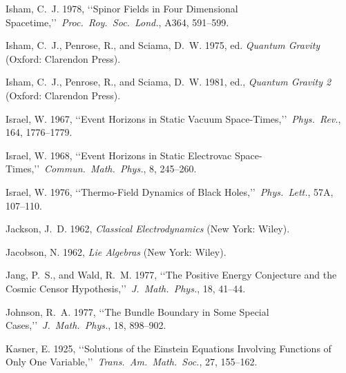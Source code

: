 
\item Isham, C.~J. 1978, \lq\lq Spinor Fields in Four Dimensional Spacetime,\rq\rq\ \emph{Proc.\ Roy.\ Soc.\ Lond.}, A364, 591--599.
\item Isham, C.~J., Penrose, R., and Sciama, D.~W. 1975, ed. \emph{Quantum Gravity} (Oxford: Clarendon Press).
\item Isham, C.~J., Penrose, R., and Sciama, D.~W. 1981, ed., \emph{Quantum Gravity 2} (Oxford: Clarendon Press).
\item Israel, W. 1967, \lq\lq Event Horizons in Static Vacuum Space-Times,\rq\rq\ \emph{Phys.\ Rev.}, 164, 1776--1779.
\item Israel, W. 1968, \lq\lq Event Horizons in Static Electrovac Space-Times,\rq\rq\ \emph{Commun.\ Math.\ Phys.}, 8, 245--260.
\item Israel, W. 1976, \lq\lq Thermo-Field Dynamics of Black Holes,\rq\rq\ \emph{Phys.\ Lett.}, 57A, 107--110.
\item Jackson, J.~D. 1962, \emph{Classical Electrodynamics} (New York: Wiley).
\item Jacobson, N. 1962, \emph{Lie Algebras} (New York: Wiley).
\item Jang, P.~S., and Wald, R.~M. 1977, \lq\lq The Positive Energy Conjecture and the Cosmic Censor Hypothesis,\rq\rq\ \emph{J.\ Math.\ Phys.}, 18, 41--44.
\item Johnson, R.~A. 1977, \lq\lq The Bundle Boundary in Some Special Cases,\rq\rq\ \emph{J.\ Math.\ Phys.}, 18, 898--902.
\item Kasner, E. 1925, \lq\lq Solutions of the Einstein Equations Involving Functions of Only One Variable,\rq\rq\ \emph{Trans.\ Am.\ Math.\ Soc.}, 27, 155--162.

